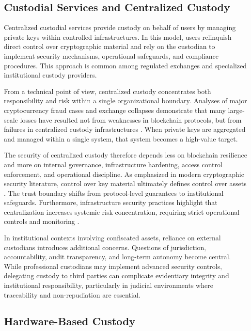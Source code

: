 \documentclass[12pt,a4paper]{report}
\begin{document}
\subsection{Custodial Services and Centralized Custody}

Centralized custodial services provide custody on behalf of users by managing private keys within controlled infrastructures. In this model, users relinquish direct control over cryptographic material and rely on the custodian to implement security mechanisms, operational safeguards, and compliance procedures. This approach is common among regulated exchanges and specialized institutional custody providers.

From a technical point of view, centralized custody concentrates both responsibility and risk within a single organizational boundary. Analyses of major cryptocurrency fraud cases and exchange collapses demonstrate that many large-scale losses have resulted not from weaknesses in blockchain protocols, but from failures in centralized custody infrastructures \cite{Scharfman2024}. When private keys are aggregated and managed within a single system, that system becomes a high-value target.

The security of centralized custody therefore depends less on blockchain resilience and more on internal governance, infrastructure hardening, access control enforcement, and operational discipline. As emphasized in modern cryptographic security literature, control over key material ultimately defines control over assets \cite{Aumasson2021}. The trust boundary shifts from protocol-level guarantees to institutional safeguards. Furthermore, infrastructure security practices highlight that centralization increases systemic risk concentration, requiring strict operational controls and monitoring \cite{Vehent2018}.

In institutional contexts involving confiscated assets, reliance on external custodians introduces additional concerns. Questions of jurisdiction, accountability, audit transparency, and long-term autonomy become central. While professional custodians may implement advanced security controls, delegating custody to third parties can complicate evidentiary integrity and institutional responsibility, particularly in judicial environments where traceability and non-repudiation are essential.

\subsection{Hardware-Based Custody}
\end{document}
